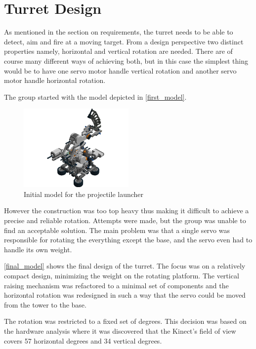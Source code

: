 \section{Turret Design}
\label{turretdesign}
As mentioned in the section on requirements, the turret needs to be able to detect, aim and fire at a moving target. 
From a design perspective two distinct properties namely, horizontal and vertical rotation are needed. There are of course many different ways of achieving both, but in this case the simplest thing would be to have one servo motor handle vertical rotation and another servo motor handle horizontal rotation. 

The group started with the model depicted in \autoref{first_model}.

\begin{figure}[hptb]
  \centering
    \includegraphics[width=0.5\textwidth]{img/Step114.png}
  \caption{Initial model for the projectile launcher}
  \label{first_model}
\end{figure}

However the construction was too top heavy thus making it difficult to achieve a precise and reliable rotation. Attempts were made, but the group was unable to find an acceptable solution. The main problem was that a single servo was responsible for rotating the everything except the base, and the servo even had to handle its own weight. 

\autoref{final_model} shows the final design of the turret. The focus was on a relatively compact design, minimizing the weight on the rotating platform. The vertical raising mechanism was refactored to a minimal set of components and the horizontal rotation was redesigned in such a way that the servo could be moved from the tower to the base. 

The rotation was restricted to a fixed set of degrees. This decision was based on the hardware analysis where it was discovered that the Kinect's field of view covers 57 horizontal degrees and 34 vertical degrees. 

